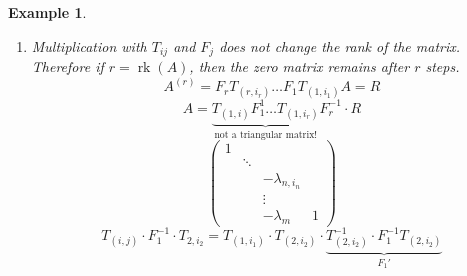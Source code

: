 \documentclass[a4paper,landscape,twocolumn]{article}
\newtheorem{ex}{Example}[section]
\begin{document}
\begin{ex}
\begin{enumerate}
\begin{enumerate}
\[            \text{with } a'_{i_2,j_2} = a_{i_2 j_2} - \lambda_{i_2}^{(i)} \cdot a_{i,j_2}
          \] \[
            F_2 = \begin{matrix}
              1 & 0 & & \\
              \lambda_j^{(2)} & 1 & & \\
              \vdots & & \ddots & \vdots \\
              \lambda_m^{(2)} & \ldots & \ldots & \ldots
            \end{matrix}
          \] \[
            \lambda_i^{(2)} = \begin{pmatrix}
              -\frac{a_{i,j_2}}{a'_{i_2,j_2}} & \\
              &
            \end{pmatrix}
          \]
          The first column is kepts unmodified $\implies$ Frobenius matrix.
          \[
            F_2 \cdot T_{(2,i_2)} \cdot F_1 \cdot T_{(1,i_1)} \cdot A =
            \begin{pmatrix}
              \infty & a_{i,j_1} & \ldots & \ldots & \ldots & \ldots & \ldots & \ldots \\
              \vdots & 0 & 0 & 0 & a_{i_2,j_2} & \ldots & \ldots & \ldots \\
              \vdots & \vdots & \vdots & \vdots & \vdots & \vdots & \vdots & \vdots \\
              0 & 0 & 0 & 0 & \ldots & \ldots & \ldots & \ldots
            \end{pmatrix}
          \]
          where at the bottom-right a $m-2\times n-j_2$ submatrix is given.
        \item Multiplication with $T_{ij}$ and $F_j$ does not change the rank of the matrix.
          Therefore if $r = \operatorname{rk}(A)$, then the zero matrix remains after $r$ steps.
          \[ A^{(r)} = F_r T_{(r,i_r)} \ldots F_1 T_{(1,i_1)} A = R \]
          \[ A = \underbrace{T_{(1,i)} F_1^1 \ldots T_{(1,i_r)}}_{\text{not a triangular matrix!}} F_r^{-1} \cdot R \]
          \[
            \begin{pmatrix}
              1 &  & & \\
                & \ddots & & \\
                &  & -\lambda_{n,i_n} & \\
                &  & \vdots & \\
                &  & -\lambda_m & 1
            \end{pmatrix}
          \]
          \[ T_{(i,j)} \cdot F_1^{-1} \cdot T_{2,i_2} = T_{(1,i_1)} \cdot T_{(2,i_2)} \cdot \underbrace{T_{(2,i_2)}^{-1} \cdot F_1^{-1} T_{(2,i_2)}}_{F_1'} \]
      \end{enumerate}
  \end{enumerate}
\end{ex}
\end{document}
